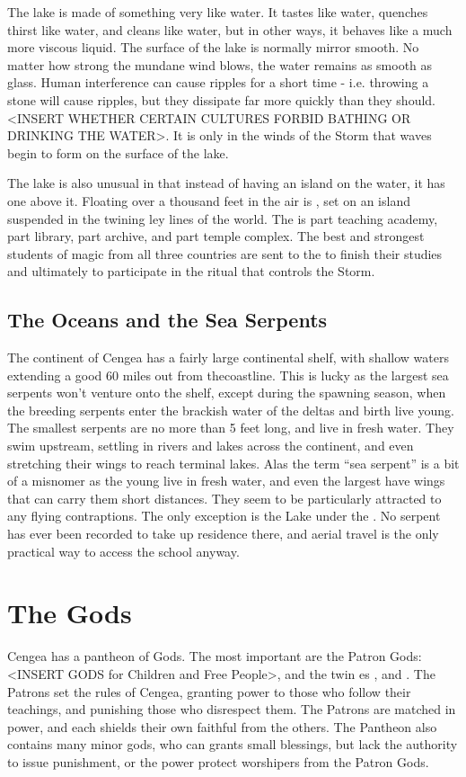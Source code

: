 \documentclass[blue]{GL2020}
\begin{document}
The lake is made of something very like water. It tastes like water, quenches thirst like water, and cleans like water, but in other ways, it behaves like a much more viscous liquid. The surface of the lake is normally mirror smooth. No matter how strong the mundane wind blows, the water remains as smooth as glass. Human interference can cause ripples for a short time - i.e. throwing a stone will cause ripples, but they dissipate far more quickly than they should. <INSERT WHETHER CERTAIN CULTURES FORBID BATHING OR DRINKING THE WATER>. It is only in the winds of the Storm that waves begin to form on the surface of the lake.

The lake is also unusual in that instead of having an island on the water, it has one above it. Floating over a thousand feet in the air is \pSchool{}, set on an island suspended in the twining ley lines of the world. The \pSchool{} is part teaching academy, part library, part archive, and part temple complex. The best and strongest students of magic from all three countries are sent to the \pSc{} to finish their studies and ultimately to participate in the ritual that controls the Storm.

\subsection*{The Oceans and the Sea Serpents}
The continent of Cengea has a fairly large continental shelf, with shallow waters extending a good 60 miles out from thecoastline. This is lucky as the largest sea serpents won't venture onto the shelf, except during the spawning season, when the breeding serpents enter the brackish water of the deltas and birth live young. The smallest serpents are no more than 5 feet long, and live in fresh water. They swim upstream, settling in rivers and lakes across the continent, and even stretching their wings to reach terminal lakes. Alas the term ``sea serpent'' is a bit of a misnomer as the young live in fresh water, and even the largest have wings that can carry them short distances. They seem to be particularly attracted to any flying contraptions. The only exception is the Lake under the \pSchool{}. No serpent has ever been recorded to take up residence there, and aerial travel is the only practical way to access the school anyway.

\section*{The Gods}
Cengea has a pantheon of Gods. The most important are the Patron Gods: <INSERT GODS for Children and Free People>, and the twin \cEbb{\God}es \cEbbFull{}, and \cFlowFull{}. The Patrons set the rules of Cengea, granting power to those who follow their teachings, and punishing those who disrespect them. The Patrons are matched in power, and each shields their own faithful from the others. The Pantheon also contains many minor gods, who can grants small blessings, but lack the authority to issue punishment, or the power protect worshipers from the Patron Gods.
\end{document}
